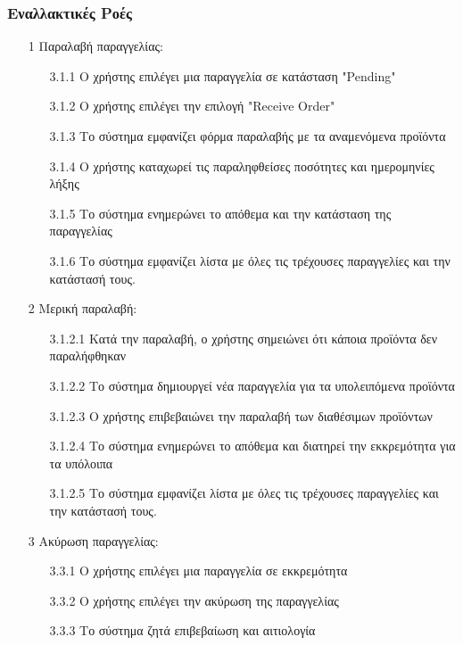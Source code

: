 \documentclass[12pt,a4paper,twoside]{book}
\begin{document}
\subsubsection{Εναλλακτικές Ροές}
\begin{enumerate}
  \item[1 ] Παραλαβή παραγγελίας:
        \begin{enumerate}
          \item[3.1.1 ] Ο χρήστης επιλέγει μια παραγγελία σε κατάσταση "Pending" %
          \item[3.1.2 ] Ο χρήστης επιλέγει την επιλογή "Receive Order" %
          \item[3.1.3 ] Το σύστημα εμφανίζει φόρμα παραλαβής με τα αναμενόμενα προϊόντα
          \item[3.1.4 ] Ο χρήστης καταχωρεί τις παραληφθείσες ποσότητες και ημερομηνίες λήξης
          \item[3.1.5 ] Το σύστημα ενημερώνει το απόθεμα και την κατάσταση της παραγγελίας
          \item[3.1.6 ] Το σύστημα εμφανίζει λίστα με όλες τις τρέχουσες παραγγελίες και την κατάστασή τους.
        \end{enumerate}
  \item[2 ] Μερική παραλαβή:
        \begin{enumerate}
          \item[3.1.2.1 ] Κατά την παραλαβή, ο χρήστης σημειώνει ότι κάποια προϊόντα δεν παραλήφθηκαν %
          \item[3.1.2.2 ] Το σύστημα δημιουργεί νέα παραγγελία για τα υπολειπόμενα προϊόντα %
          \item[3.1.2.3 ] Ο χρήστης επιβεβαιώνει την παραλαβή των διαθέσιμων προϊόντων %
          \item[3.1.2.4 ] Το σύστημα ενημερώνει το απόθεμα και διατηρεί την εκκρεμότητα για τα υπόλοιπα %
          \item[3.1.2.5] Το σύστημα εμφανίζει λίστα με όλες τις τρέχουσες παραγγελίες και την κατάστασή τους.
        \end{enumerate}
  \item[3 ] Ακύρωση παραγγελίας:
        \begin{enumerate}
          \item[3.3.1 ] Ο χρήστης επιλέγει μια παραγγελία σε εκκρεμότητα
          \item[3.3.2 ] Ο χρήστης επιλέγει την ακύρωση της παραγγελίας
          \item[3.3.3 ] Το σύστημα ζητά επιβεβαίωση και αιτιολογία

\end{enumerate}
\end{enumerate}
\end{document}
